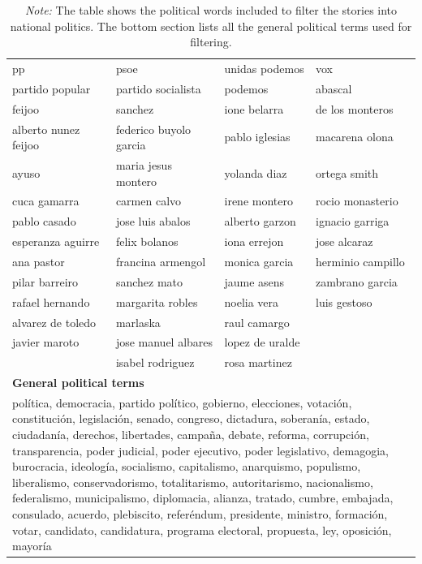 \documentclass[12pt]{article}
\begin{document}
\begin{table}[!htb]
{\begin{longtable}{|l|l|l|l|}
			pp                       & psoe                       & unidas podemos     & vox               \\
			partido popular          & partido socialista         & podemos             & abascal           \\
			feijoo                   & sanchez                    & ione belarra        & de los monteros   \\
			alberto nunez feijoo     & federico buyolo garcia     & pablo iglesias      & macarena olona    \\
			ayuso                    & maria jesus montero        & yolanda diaz        & ortega smith      \\
			cuca gamarra             & carmen calvo               & irene montero       & rocio monasterio  \\
			pablo casado             & jose luis abalos           & alberto garzon      & ignacio garriga   \\
			esperanza aguirre        & felix bolanos              & iona errejon        & jose alcaraz      \\
			ana pastor               & francina armengol          & monica garcia       & herminio campillo \\
			pilar barreiro           & sanchez mato               & jaume asens         & zambrano garcia   \\
			rafael hernando          & margarita robles           & noelia vera         & luis gestoso      \\
			alvarez de toledo        & marlaska                   & raul camargo        &                   \\
			javier maroto            & jose manuel albares        & lopez de uralde     &                   \\
			& isabel rodriguez           & rosa martinez       &                   \\
			\hline
			\multicolumn{4}{|l|}{\textbf{General political terms}}\\
			\hline
			\multicolumn{4}{|p{.95\linewidth}|}{%
				política, democracia, partido político, gobierno, elecciones, votación, constitución, legislación, senado, congreso, dictadura, soberanía, estado, ciudadanía, derechos, libertades, campaña, debate, reforma, corrupción, transparencia, poder judicial, poder ejecutivo, poder legislativo, demagogia, burocracia, ideología, socialismo, capitalismo, anarquismo, populismo, liberalismo, conservadorismo, totalitarismo, autoritarismo, nacionalismo, federalismo, municipalismo, diplomacia, alianza, tratado, cumbre, embajada, consulado, acuerdo, plebiscito, referéndum, presidente, ministro, formación, votar, candidato, candidatura, programa electoral, propuesta, ley, oposición, mayoría%
			}\\
			\hline
		\end{longtable}
	}
	
	
	\caption*{\small  \textit{Note:} The table shows the political words included to filter the stories into national politics. The bottom section lists all the general political terms used for filtering.}
	

\end{table}
\end{document}
